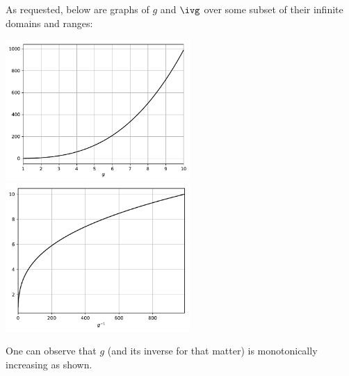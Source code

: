 {  As requested, below are graphs of $g$ and $\ivg$ over some subset of their infinite domains and ranges:

  {\centering
    \includegraphics[width=7cm]{figs/ex_2_6_g}
    \includegraphics[width=7cm]{figs/ex_2_6_gi}
    
  }
  One can observe that $g$ (and its inverse for that matter) is monotonically increasing as shown.
}
